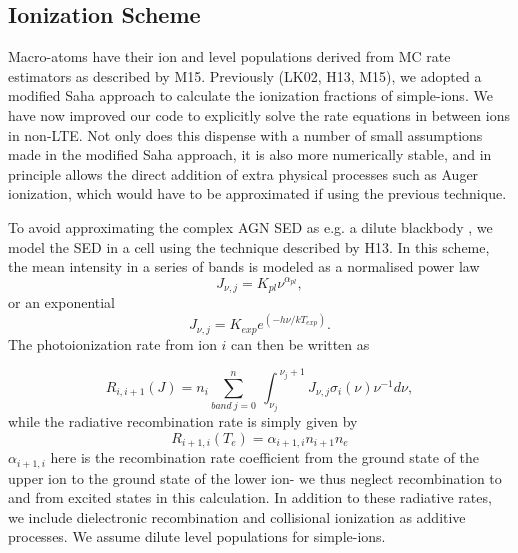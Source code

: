 \documentclass[useAMS,usenatbib]{mn2e_x}
\begin{document}
\subsection{Ionization Scheme}

Macro-atoms have their ion and level populations derived from
MC rate estimators as described by M15. Previously (LK02, H13, M15),
we adopted a modified Saha approach to calculate the ionization fractions
of simple-ions. We have now improved our code to explicitly solve the 
rate equations in between ions in non-LTE. 
Not only does this
dispense with a number of small assumptions made in the modified Saha approach, 
it is also more numerically stable, 
and in principle allows the direct addition of extra physical 
processes such as Auger ionization, which would have to be approximated 
if using the previous technique.

To avoid approximating the complex AGN SED as e.g. a dilute blackbody \citep[][M15]{ML93},
we model the SED in a cell using the technique described by H13. In this scheme,
the mean intensity in a series of bands is modeled as a normalised power law 
\begin{equation}
J_{\nu,j}=K_{pl}\nu^{\alpha_{pl}},
\end{equation}
or an exponential 
\begin{equation}
J_{\nu,j}=K_{exp}e^{(-h\nu/kT_{exp})}.
\end{equation}
The photoionization rate from ion $i$ can then be written as 

\begin{equation}
R_{i,i+1}(J)= 
\displaystyle{n_i \sum_{band~j=0}^{n}}~{\int_{\nu_j}^{~\nu_j+1}{J_{\nu,j}\sigma_i(\nu)\nu^{-1}d\nu}},
\end{equation}
while the radiative recombination rate is simply given by 
\begin{equation}
R_{i+1,i}(T_e) = \alpha_{i+1,i} n_{i+1} n_e
\end{equation}
$\alpha_{i+1,i}$ here is the recombination rate coefficient from the ground state
of the upper ion to the ground state of the lower ion- we thus neglect recombination
to and from excited states in this calculation. In addition to these
radiative rates, we include dielectronic recombination and collisional ionization
as additive processes. We assume dilute level populations 
for simple-ions.

\end{document}
